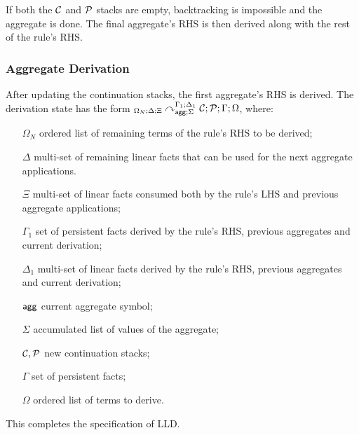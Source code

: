 If both the $\mathcal{C}$ and $\mathcal{P}$ stacks are empty, backtracking is
impossible and the aggregate is done. The final aggregate's RHS is then derived
along with the rest of the rule's RHS.



\subsubsection{Aggregate Derivation}

After updating the continuation stacks, the first aggregate's RHS is derived.
The derivation state has the form
${{}_{\Omega_N ; \Delta ; \Xi}\curvearrowright}_{\mathsf{agg} ; \Sigma}^{\Gamma_1; \Delta_1} \; \mathcal{C};
\mathcal{P} ; \Gamma ; \Omega$, where:

\begin{enumerate}

   \item[$\Omega_N$] ordered list of remaining terms of the rule's RHS to be
      derived;

   \item[$\Delta$] multi-set of remaining linear facts that can be used for
   the next aggregate applications.

   \item[$\Xi$] multi-set of linear facts consumed both by the rule's LHS and
      previous aggregate applications;

   \item[$\Gamma_1$] set of persistent facts derived by the rule's RHS, previous
      aggregates and current derivation;

   \item[$\Delta_1$] multi-set of linear facts derived by the rule's RHS,
      previous aggregates and current derivation;

   \item[$\mathsf{agg}$] current aggregate symbol;
   \item[$\Sigma$] accumulated list of values of the aggregate;
   \item[$\mathcal{C}, \mathcal{P}$] new continuation stacks;
   \item[$\Gamma$] set of persistent facts;
   \item[$\Omega$] ordered list of terms to derive.
\end{enumerate}



This completes the specification of LLD.

